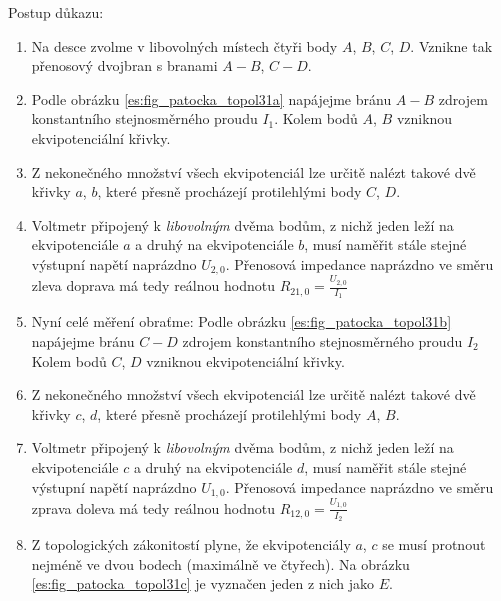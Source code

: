         Postup důkazu:
        \begin{enumerate}[noitemsep]
          \item Na desce zvolme v libovolných místech čtyři body \(A\), \(B\), \(C\), \(D\).    
                Vznikne tak přenosový dvojbran s branami \(A-B\), \(C-D\).
          
          \item Podle obrázku \ref{es:fig_patocka_topol31a} napájejme bránu \(A-B\) zdrojem 
                konstantního stejnosměrného proudu \(I_1\). Kolem bodů \(A\), \(B\) vzniknou 
                ekvipotenciální křivky.
          
          \item Z nekonečného množství všech ekvipotenciál lze určitě nalézt takové dvě křivky 
               \(a\), \(b\), které přesně procházejí protilehlými body \(C\), \(D\).
          
          \item Voltmetr připojený k \emph{libovolným} dvěma bodům, z nichž jeden leží na 
                ekvipotenciále \(a\) a druhý na ekvipotenciále \(b\), musí naměřit stále stejné 
                výstupní napětí naprázdno \(U_{2,0}\). Přenosová impedance naprázdno ve směru zleva 
                doprava má tedy reálnou hodnotu \(R_{21,0} = \frac{U_{2,0}}{I_1}\)
          
          \item Nyní celé měření obraťme: Podle obrázku \ref{es:fig_patocka_topol31b} napájejme 
                bránu \(C-D\) zdrojem konstantního stejnosměrného proudu \(I_2\) Kolem bodů \(C\), 
                \(D\) vzniknou ekvipotenciální křivky.
          
          \item Z nekonečného množství všech ekvipotenciál lze určitě nalézt takové dvě křivky 
                \(c\), \(d\), které přesně procházejí protilehlými body \(A\), \(B\).
          
          \item Voltmetr připojený k \emph{libovolným} dvěma bodům, z nichž jeden leží na 
                ekvipotenciále \(c\) a druhý na ekvipotenciále \(d\), musí naměřit stále stejné 
                výstupní napětí naprázdno \(U_{1,0}\). Přenosová impedance naprázdno ve směru 
                zprava doleva má tedy reálnou hodnotu \(R_{12,0} = \frac{U_{1,0}}{I_2}\)
          
          \item Z topologických zákonitostí plyne, že ekvipotenciály \(a\), \(c\) se musí protnout 
                nejméně ve dvou bodech (maximálně ve čtyřech). Na obrázku 
                \ref{es:fig_patocka_topol31c} je vyznačen jeden z nich jako \(E\).
          

\end{enumerate}
